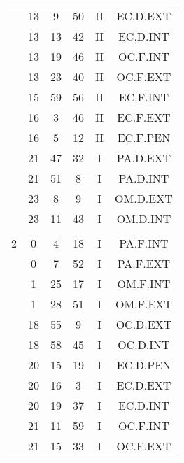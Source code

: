 \documentclass[12pt, a4paper]{article}
\begin{document}
\begin{multicols}{3}
{\begin{tabular}{c c c c c c}
	 	 	 	 & 13 & 9 & 50 & II & EC.D.EXT\\%
	 	 	 	 & 13 & 13 & 42 & II & EC.D.INT\\%
	 	 	 	 & 13 & 19 & 46 & II & OC.F.INT\\%
	 	 	 	 & 13 & 23 & 40 & II & OC.F.EXT\\%
	 	 	 	 & 15 & 59 & 56 & II & EC.F.INT\\%
	 	 	 	 & 16 & 3 & 46 & II & EC.F.EXT\\%
	 	 	 	 & 16 & 5 & 12 & II & EC.F.PEN\\%
	 	 	 	 & 21 & 47 & 32 & I & PA.D.EXT\\%
	 	 	 	 & 21 & 51 & 8 & I & PA.D.INT\\%
	 	 	 	 & 23 & 8 & 9 & I & OM.D.EXT\\%
	 	 	 	 & 23 & 11 & 43 & I & OM.D.INT\\%
	 	 	 	 & & & & & \\%
	 	 	 	2 & 0 & 4 & 18 & I & PA.F.INT\\%
	 	 	 	 & 0 & 7 & 52 & I & PA.F.EXT\\%
	 	 	 	 & 1 & 25 & 17 & I & OM.F.INT\\%
	 	 	 	 & 1 & 28 & 51 & I & OM.F.EXT\\%
	 	 	 	 & 18 & 55 & 9 & I & OC.D.EXT\\%
	 	 	 	 & 18 & 58 & 45 & I & OC.D.INT\\%
	 	 	 	 & 20 & 15 & 19 & I & EC.D.PEN\\%
	 	 	 	 & 20 & 16 & 3 & I & EC.D.EXT\\%
	 	 	 	 & 20 & 19 & 37 & I & EC.D.INT\\%
	 	 	 	 & 21 & 11 & 59 & I & OC.F.INT\\%
	 	 	 	 & 21 & 15 & 33 & I & OC.F.EXT\\%

\end{tabular}}
\end{multicols}
\end{document}
